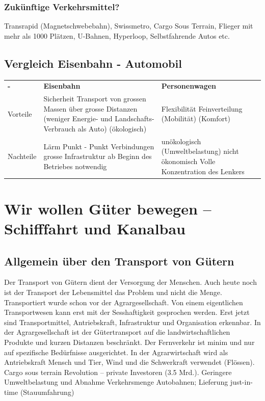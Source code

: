 \documentclass[10pt, openright=true]{scrartcl}
\begin{document}
\subsubsection{Zukünftige Verkehrsmittel?}
Transrapid (Magnetschwebebahn), Swissmetro, Cargo Sous Terrain, Flieger mit mehr als 1000 Plätzen, U-Bahnen, Hyperloop, Selbstfahrende Autos etc.
\subsection{Vergleich Eisenbahn - Automobil}
\begin{tabularx}{1\textwidth}{L{2cm} L{5cm}  X}
 \textbf{-} & \textbf{Eisenbahn} & \textbf{Personenwagen} \\ 
Vorteile &  Sicherheit \newline Transport von grossen Massen über grosse Distanzen \newline (weniger Energie- und Landschafts- Verbrauch als Auto) \newline (ökologisch) & Flexibilität \newline Feinverteilung \newline (Mobilität) \newline (Komfort)\\
 Nachteile& Lärm \newline Punkt - Punkt Verbindungen \newline grosse Infrastruktur ab Beginn des Betriebes notwendig & unökologisch (Umweltbelastung) \newline nicht ökonomisch \newline Volle Konzentration des Lenkers\\
\end{tabularx}
\section{Wir wollen Güter bewegen – Schifffahrt und Kanalbau}
\subsection{Allgemein über den Transport von Gütern}
Der Transport von Gütern dient der Versorgung der Menschen. Auch heute noch ist der Transport der Lebensmittel das Problem und nicht die Menge. Transportiert wurde schon vor der Agrargesellschaft. Von einem eigentlichen Transportwesen kann erst mit der Sesshaftigkeit gesprochen werden. Erst jetzt sind Transportmittel, Antriebskraft, Infrastruktur und Organisation erkennbar. In der Agrargesellschaft ist der Gütertransport auf die landwirtschaftlichen Produkte und kurzen Distanzen beschränkt. Der Fernverkehr ist minim und nur auf spezifische Bedürfnisse ausgerichtet. In der Agrarwirtschaft wird als Antriebskraft Mensch und Tier, Wind und die Schwerkraft verwendet (Flössen). Cargo sous terrain Revolution – private Investoren (3.5 Mrd.). Geringere Umweltbelastung und Abnahme Verkehrsmenge Autobahnen; Lieferung just-in-time (Stauumfahrung)
\end{document}
